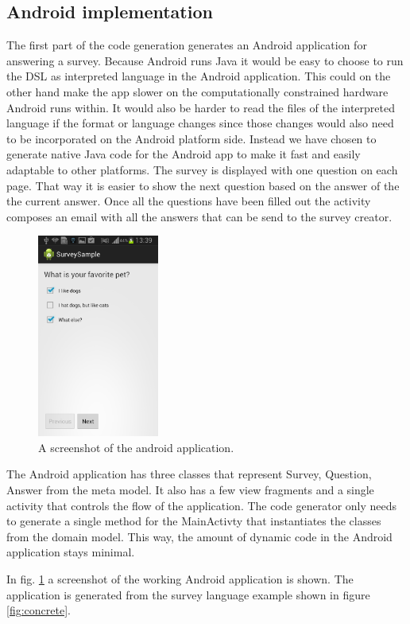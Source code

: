 \documentclass[runningheads]{llncs}
\begin{document}
\subsection{Android implementation}
The first part of the code generation generates an Android application for answering a survey. Because Android runs Java it would be easy to choose to run the DSL as interpreted language in the Android application. This could on the other hand make the app slower on the computationally constrained hardware Android runs within. It would also be harder to read the files of the interpreted language if the format or language changes since those changes would also need to be incorporated on the Android platform side. Instead we have chosen to generate native Java code for the Android app to make it fast and easily adaptable to other platforms.
The survey is displayed with one question on each page. That way it is easier to show the next question based on the answer of the the current answer. Once all the questions have been filled out the activity composes an email with all the answers that can be send to the survey creator.

\begin{figure}[h]
\centering
\includegraphics[width=4cm]{android_screenshot}
\caption{A screenshot of the android application.}
\label{fig:android_screenshot}
\end{figure}

The Android application has three classes that represent \textsf{Survey}, \textsf{Question}, \textsf{Answer} from the meta model. It also has a few view fragments and a single activity that controls the flow of the application. The code generator only needs to generate a single method for the \textsf{MainActivty} that instantiates the classes from the domain model. This way, the amount of dynamic code in the Android application stays minimal.

In fig. \ref{fig:android_screenshot} a screenshot of the working Android application is shown. The application is generated from the survey language example shown in figure \ref{fig:concrete}.
\end{document}
